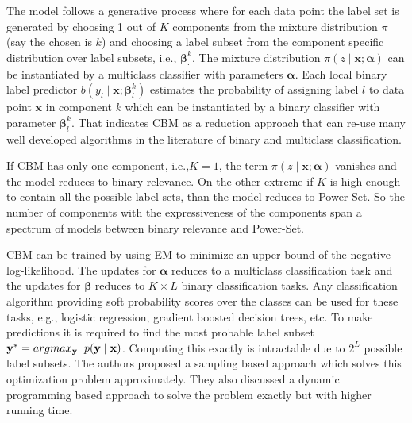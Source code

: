 The model follows a generative process where for each data point the label set is generated by choosing 1 out of $K$ components from the mixture distribution $\pi$ (say the chosen is $k$) and choosing a label subset from the component specific distribution over label subsets, i.e., $\boldsymbol{\beta}_{\cdot}^{k}$. The mixture distribution $\pi(z \mid \mathbf{x};\boldsymbol{\alpha})$ can be instantiated by a multiclass classifier with parameters $\boldsymbol{\alpha}$. Each local binary label predictor $b(y_l \mid \mathbf{x};\boldsymbol{\beta}_l^k)$ estimates the probability of assigning label $l$ to data point $\mathbf{x}$ in component $k$ which can be instantiated by a binary classifier with parameter $\boldsymbol{\beta}_l^k$. That indicates CBM as a reduction approach that can re-use many well developed algorithms in the literature of binary and multiclass classification.

If CBM has only one component, i.e.,$K=1$, the term $\pi(z \mid \mathbf{x};\boldsymbol{\alpha})$ vanishes and the model reduces to binary relevance. On the other extreme if $K$ is high enough to contain all the possible label sets, than the model reduces to Power-Set. So the number of components with the expressiveness of the components span a spectrum of models between binary relevance and Power-Set.

CBM can be trained by using EM to minimize an upper bound of the negative log-likelihood. The updates for $\boldsymbol{\alpha}$ reduces to a multiclass classification task and the updates for $\boldsymbol{\beta}$ reduces to $K \times L$ binary classification tasks. Any classification algorithm providing soft probability scores over the classes can be used for these tasks, e.g., logistic regression, gradient boosted decision trees, etc.
To make predictions it is required to find the most probable label subset $\mathbf{y^{*}} = argmax_{\mathbf{y}}   \hspace{2mm} p(\mathbf{y} \mid \mathbf{x})$. Computing this exactly is intractable due to $2^L$ possible label subsets. The authors proposed a sampling based approach which solves this optimization problem approximately. They also discussed a dynamic programming based approach to solve the problem exactly but with higher running time. 
%
%
%
